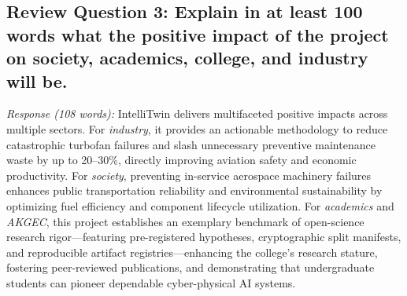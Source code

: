 \documentclass[12pt,a4paper]{article}
\begin{document}
\subsection*{Review Question 3: Explain in at least 100 words what the positive impact of the project on society, academics, college, and industry will be.}
\textit{Response (108 words):} IntelliTwin delivers multifaceted positive impacts across multiple sectors. For \textit{industry}, it provides an actionable methodology to reduce catastrophic turbofan failures and slash unnecessary preventive maintenance waste by up to 20--30\%, directly improving aviation safety and economic productivity. For \textit{society}, preventing in-service aerospace machinery failures enhances public transportation reliability and environmental sustainability by optimizing fuel efficiency and component lifecycle utilization. For \textit{academics} and \textit{AKGEC}, this project establishes an exemplary benchmark of open-science research rigor---featuring pre-registered hypotheses, cryptographic split manifests, and reproducible artifact registries---enhancing the college's research stature, fostering peer-reviewed publications, and demonstrating that undergraduate students can pioneer dependable cyber-physical AI systems.
\end{document}
